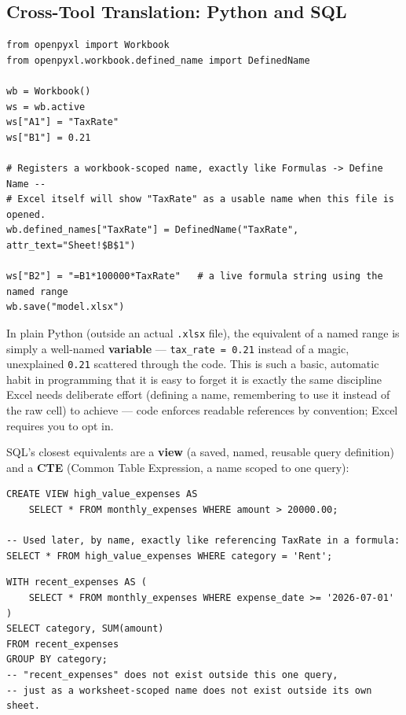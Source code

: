 \documentclass[11pt,a4paper]{article}
\begin{document}
\subsection{Cross-Tool Translation: Python and SQL}

\begin{lstlisting}[style=pythonstyle, caption={Named ranges, the openpyxl way -- defined names actually written into the .xlsx file}]
from openpyxl import Workbook
from openpyxl.workbook.defined_name import DefinedName

wb = Workbook()
ws = wb.active
ws["A1"] = "TaxRate"
ws["B1"] = 0.21

# Registers a workbook-scoped name, exactly like Formulas -> Define Name --
# Excel itself will show "TaxRate" as a usable name when this file is opened.
wb.defined_names["TaxRate"] = DefinedName("TaxRate", attr_text="Sheet!$B$1")

ws["B2"] = "=B1*100000*TaxRate"   # a live formula string using the named range
wb.save("model.xlsx")
\end{lstlisting}

\begin{keyconcept}
In plain Python (outside an actual \texttt{.xlsx} file), the equivalent of a named range is simply a well-named \textbf{variable} --- \texttt{tax\_rate = 0.21} instead of a magic, unexplained \texttt{0.21} scattered through the code. This is such a basic, automatic habit in programming that it is easy to forget it is exactly the same discipline Excel needs deliberate effort (defining a name, remembering to use it instead of the raw cell) to achieve --- code enforces readable references by convention; Excel requires you to opt in.
\end{keyconcept}

SQL's closest equivalents are a \textbf{view} (a saved, named, reusable query definition) and a \textbf{CTE} (Common Table Expression, a name scoped to one query):

\begin{lstlisting}[style=sqlstyle, caption={A view: a persistent, named definition usable in any future query, like a workbook-scoped named range}]
CREATE VIEW high_value_expenses AS
    SELECT * FROM monthly_expenses WHERE amount > 20000.00;

-- Used later, by name, exactly like referencing TaxRate in a formula:
SELECT * FROM high_value_expenses WHERE category = 'Rent';
\end{lstlisting}

\begin{lstlisting}[style=sqlstyle, caption={A CTE: a name scoped only to the one query it's defined in, like a worksheet-scoped named range}]
WITH recent_expenses AS (
    SELECT * FROM monthly_expenses WHERE expense_date >= '2026-07-01'
)
SELECT category, SUM(amount)
FROM recent_expenses
GROUP BY category;
-- "recent_expenses" does not exist outside this one query,
-- just as a worksheet-scoped name does not exist outside its own sheet.
\end{lstlisting}
\end{document}
